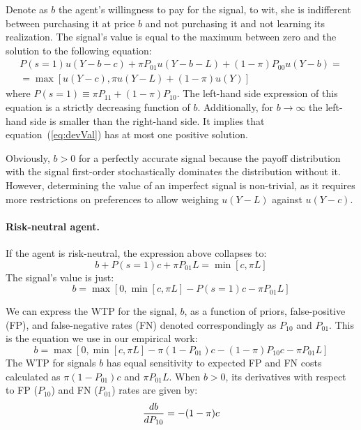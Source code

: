 \documentclass[12pt,a4paper]{article}
\begin{document}
Denote as $b$ the agent's willingness to pay for the signal, to wit, she is indifferent between purchasing it at price $b$ and not purchasing it and not learning its realization. The signal's value is equal to the maximum between zero and the solution to the following equation:
\begin{equation}\label{eq:devVal}
\begin{split}
P(s=1)u(Y-b-c)+\pi P_{01}u(Y-b-L)+(1-\pi)P_{00}u(Y-b)=\\=\max[u(Y-c),\pi u(Y-L)+(1-\pi) u(Y)] 
\end{split}
\end{equation}
where $P(s=1)\equiv \pi P_{11}+(1-\pi)P_{10}$. The left-hand side expression of this equation is a strictly decreasing function of $b$. Additionally, for $b\rightarrow \infty$ the left-hand side is smaller than the right-hand side. It implies that equation~(\ref{eq:devVal}) has at most one positive solution.

Obviously, $b>0$ for a perfectly accurate signal because the payoff distribution with the signal first-order stochastically dominates the distribution without it. 
However, determining the value of an imperfect signal is non-trivial, as it requires more restrictions on preferences to allow weighing $u(Y-L)$ against $u(Y-c)$.


\paragraph{Risk-neutral agent.} If the agent is risk-neutral, the expression above collapses to:
\[b+P(s=1)c+\pi P_{01}L=\min[c,\pi L]
\]
The signal's value is just:
\[
b=\max[0,\min[c,\pi L]-P(s=1)c-\pi P_{01}L]
\]

We can express the WTP for the signal, $b$, as a function of priors, false-positive (FP), and false-negative rates (FN) denoted correspondingly as $P_{10}$ and $P_{01}$. This is the equation we use in our empirical work:
\begin{equation}
b=\max[0,\min[c,\pi L]-\pi (1-P_{01})c-(1-\pi)P_{10}c-\pi P_{01}L]
\end{equation}\label{eq:rnWTP}
The WTP for signals $b$ has equal sensitivity to expected FP and FN costs calculated as $\pi (1-P_{01})c$ and $\pi P_{01}L$. When $b>0$, its derivatives with respect to FP ($P_{10}$) and FN ($P_{01}$) rates are given by:
\begin{equation}\label{eq:dWTP_dFP}
{db\over dP_{10}}=-(1-\pi)c
\end{equation}
\end{document}

